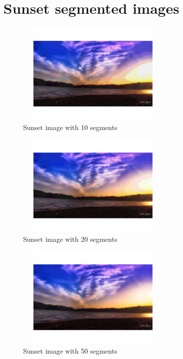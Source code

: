 \documentclass[a4paper, 11pt]{article}
\begin{document}
\section{Sunset segmented images}
\begin{figure}[h!]
\centering
    \includegraphics[width=7.5cm, height=5cm]{images/Sunset_10.jpeg}
    \caption{Sunset image with 10 segments}
\end{figure}
\begin{figure}[h!]
\centering
    \includegraphics[width=7.5cm, height=5cm]{images/Sunset_20.jpeg}
    \caption{Sunset image with 20 segments}
\end{figure}
\begin{figure}[h!]
\centering
    \includegraphics[width=7.5cm, height=5cm]{images/Sunset_50.jpeg}
    \caption{Sunset image with 50 segments}
\end{figure}
\clearpage
\end{document}
